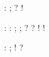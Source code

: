 

\enablemode[activecolon] \usemodule[tryout] %

\installactivecharacter :
\installactivecharacter ;
\installactivecharacter ?
\installactivecharacter !

\unprotect

\startlanguagespecifics[\s!fr]
     : {\removeunwantedspaces\prewordbreak\kern{}\currentmainlanguage{:}:}
     ; {\removeunwantedspaces\prewordbreak\kern{}\currentmainlanguage{;};}
     ? {\removeunwantedspaces\prewordbreak\kern{}?}
     ! {\removeunwantedspaces\prewordbreak\kern{}\currentmainlanguage{!}!}
\stoplanguagespecifics

\startlanguagespecifics[\s!fr]
     : {\mathortext{:}{\directdiscretionary{:}}}
     ; {\mathortext{;}{\directdiscretionary{;}}}
     ! {\mathortext{!}{\directdiscretionary{!}}}
     ? {}
\stoplanguagespecifics

%

\protect \endinput
